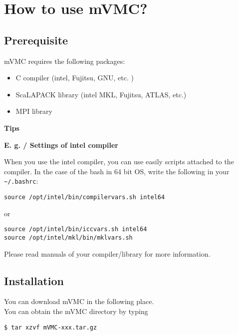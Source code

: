\chapter{How to use mVMC?}
\label{Ch:HowTo}

\section{Prerequisite}

mVMC requires the following packages:
\begin{itemize}
\item C compiler (intel, Fujitsu, GNU, etc. )
\item ScaLAPACK library (intel MKL, Fujitsu, ATLAS, etc.)
\item MPI library
\end{itemize}

\begin{screen}
\Large 
{\bf Tips}
\normalsize

{\bf E. g. / Settings of intel compiler}

When you use the intel compiler, you can use easily scripts attached to the compiler.
In the case of the bash in 64 bit OS, write the following in your \verb|~/.bashrc|:
\begin{verbatim}
source /opt/intel/bin/compilervars.sh intel64
\end{verbatim}
or
\begin{verbatim}
source /opt/intel/bin/iccvars.sh intel64
source /opt/intel/mkl/bin/mklvars.sh
\end{verbatim}

Please read manuals of your compiler/library for more information.

\end{screen}

\section{Installation}

You can download mVMC in the following place.\\

You can obtain the mVMC directory by typing
\begin{verbatim}
$ tar xzvf mVMC-xxx.tar.gz
\end{verbatim}

